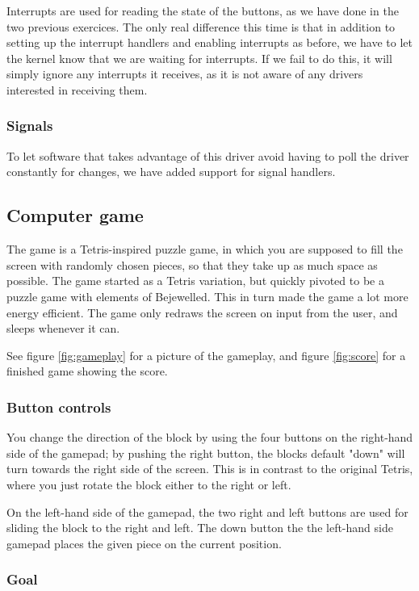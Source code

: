 Interrupts are used for reading the state of the buttons, as we have done in the two previous exercices.
The only real difference this time is that in addition to setting up the interrupt handlers and enabling interrupts as before, we have to let the kernel know that we are waiting for interrupts. If we fail to do this, it will simply ignore any interrupts it receives, as it is not aware of any drivers interested in receiving them.

\subsubsection{Signals}

To let software that takes advantage of this driver avoid having to poll the driver constantly for changes, we have added support for signal handlers.

\subsection{Computer game}

The game is a Tetris-inspired puzzle game, in which you are supposed to fill the screen with randomly chosen pieces, so that they take up as much space as possible.
The game started as a Tetris variation, but quickly pivoted to be a puzzle game with elements of Bejewelled.
This in turn made the game a lot more energy efficient.
The game only redraws the screen on input from the user, and sleeps whenever it can.

See figure \ref{fig:gameplay} for a picture of the gameplay, and figure \ref{fig:score} for a finished game showing the score.

\subsubsection{Button controls}

You change the direction of the block by using the four buttons on the right-hand side of the gamepad; by pushing the right button, the blocks default "down" will turn towards the right side of the screen.
This is in contrast to the original Tetris, where you just rotate the block either to the right or left.

On the left-hand side of the gamepad, the two right and left buttons are used for sliding the block to the right and left.
The down button the the left-hand side gamepad places the given piece on the current position.

\subsubsection{Goal}

